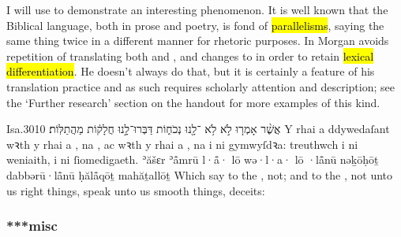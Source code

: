 \begin{paper}
	I will use  to demonstrate an interesting phenomenon. It is well known that the Biblical language, both in prose and poetry, is fond of \hl{parallelisms}, saying the same thing twice in a different manner for rhetoric purposes. In  Morgan avoids repetition of  translating both  and , and changes   to  in order to retain \hl{lexical differentiation}. He doesn’t always do that, but it is certainly a feature of his translation practice and as such requires scholarly attention and description; see the ‘Further research’ section on the handout for more examples of this kind.
\end{paper}

\begin{example}{Isa.}{30}{10}{}{}
	\quoling
	{אֲשֶׁ֨ר אָמְר֤וּ  לֹ֣א   לֹ֥א ־לָ֖נוּ נְכֹח֑וֹת דַּבְּרוּ־לָ֣נוּ חֲלָק֔וֹת  מַהֲתַלּֽוֹת׃}
	{Y rhai a ddywedaſant wꝛth y rhai a , na , ac wꝛth y rhai a , na  i ni gymwyſdꝛa: treuthwch i ni weniaith,  i ni ſiomedigaeth.}
	{ʾăšɛr ʾå̄mrū l·å̄· lō  wə·l·a· lō ·lå̄nū nəḵōḥōṯ dabbərū·lå̄nū ḥălå̄qōṯ  mahăṯallōṯ}
	{Which say to the ,  not; and to the ,  not unto us right things, speak unto us smooth things,  deceits:}
\end{example}




\subsubsection{***misc}





\subsubsection{}

